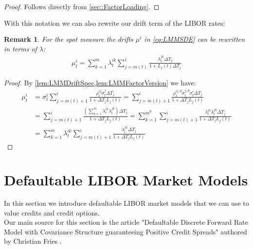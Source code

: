 \documentclass[12pt]{article}
\newtheorem{remark}[theorem]{Remark}
\begin{document}
	\begin{proof}
		Follows directly from \cref{sec::FactorLoading}.
	\end{proof}
	With this notation we can also rewrite our drift term of the LIBOR rates:
	\begin{remark}\label{rem:LMMDriftFactorLoadings}
		For the spot measure the drifts $\mu^{i}$ in \cref{eq:LMMSDE} can be rewritten in terms of $\lambda$:
		\begin{align*}
			\mu^{i}_t = \sum_{k=1}^{m}\lambda^{i k}_t \sum_{j=m(t)}^{i}\frac{\lambda^{j k}_t\Delta T_j}{1 + L_j(t)\Delta T_j}
		\end{align*}
	\end{remark}
	\begin{proof}
		By \cref{lem:LMMDriftSpec,lem:LMMFactorVersion} we have:
		\begin{align*}
			\mu^{i}_t &= \sigma^{i}_t\sum_{j=m(t)+1}^{i}\frac{\rho^{i j}_t \sigma^{j}_t\Delta T_j}{1 + \Delta T_j L_j(t)} = \sum_{j=m(t)+1}^{i}\frac{\rho^{i j, d}_t \sigma^{j, d}_t \sigma^{i}_t\Delta T_j}{1 + \Delta T_j L_j(t)}\\
			&= \sum_{j=m(t)+1}^{i}\frac{\left(\sum_{k=1}^{m}\lambda^{i k}_t\lambda^{j k}_t\right)\Delta T_j}{1 + \Delta T_j L_j(t)}
			=\sum_{k=1}^{m^d}\sum_{j=m(t)+1}^{i}\frac{\lambda^{i k}_t\lambda^{j k}_t\Delta T_j}{1 + \Delta T_j L_j(t)}\\
			&= \sum_{k=1}^{m}\lambda^{i k}_t\sum_{j=m(t)+1}^{i}\frac{\lambda^{j k}_t\Delta T_j}{1 + \Delta T_j L_j(t)}
		\end{align*}
	\end{proof}
	
	
	
	
	\pagebreak
	\section{Defaultable LIBOR Market Models}
	
	In this section we introduce defaultable LIBOR market models that we can use to value credits and credit options.\\
	Our main source for this section is the article "Defaultable Discrete Forward Rate Model with Covariance Structure guaranteeing Positive Credit Spreads" authored by Christian Fries \cite{FriesDLMM}.
\end{document}
